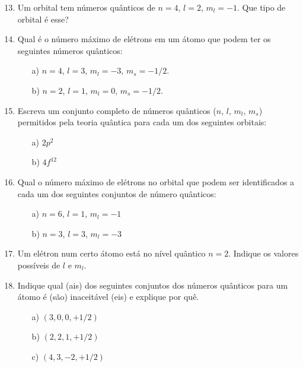\documentclass[a4paper, 12pt]{article}
\begin{document}
\begin{enumerate}
	\setcounter{enumi}{12}
	\item Um orbital tem números quânticos de \(n = 4\), \(l = 2\), \(m_l = -1\). Que tipo de orbital é esse?
	      
	\item Qual é o número máximo de elétrons em um átomo que podem ter os seguintes números quânticos:
	      \begin{enumerate}
		      \item[a)] \(n = 4\), \(l = 3\), \(m_l = -3\), \(m_s = -1/2\).
		      \item[b)] \(n = 2\), \(l = 1\), \(m_l = 0\), \(m_s = -1/2\).
	      \end{enumerate}
	      
	\item Escreva um conjunto completo de números quânticos (\(n\), \(l\), \(m_l\), \(m_s\)) permitidos pela teoria quântica para cada um dos seguintes orbitais:
	      \begin{enumerate}
		      \item[a)] \(2p^2\)
		      \item[b)] \(4f^{12}\)
	      \end{enumerate}
	      
	\item Qual o número máximo de elétrons no orbital que podem ser identificados a cada um dos seguintes conjuntos de número quânticos:
	      \begin{enumerate}
		      \item[a)] \(n = 6\), \(l = 1\), \(m_l = -1\)
		      \item[b)] \(n = 3\), \(l = 3\), \(m_l = -3\)
	      \end{enumerate}
	      
	\item Um elétron num certo átomo está no nível quântico \(n = 2\). Indique os valores possíveis de \(l\) e \(m_l\).
	      
	\item Indique qual (ais) dos seguintes conjuntos dos números quânticos para um átomo é (são) inaceitável (eis) e explique por quê.
	      \begin{enumerate}
		      \item[a)] \((3, 0, 0, +1/2)\)
		      \item[b)] \((2, 2, 1, +1/2)\)
		      \item[c)] \((4, 3, -2, +1/2)\)
	      \end{enumerate}
	      

\end{enumerate}
\end{document}
